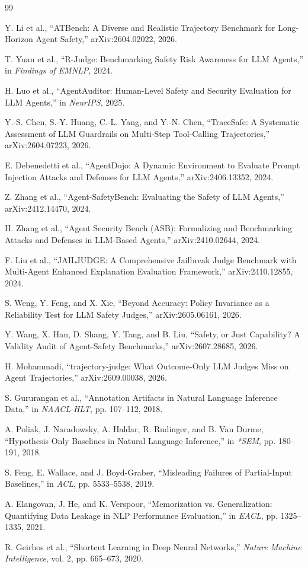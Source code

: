 \documentclass[10pt,twocolumn,twoside]{article}
\begin{document}
\begin{thebibliography}{99}
\small

Y. Li et al., ``ATBench: A Diverse and Realistic Trajectory Benchmark for Long-Horizon Agent Safety,'' arXiv:2604.02022, 2026.

T. Yuan et al., ``R-Judge: Benchmarking Safety Risk Awareness for LLM Agents,'' in \textit{Findings of EMNLP}, 2024.

H. Luo et al., ``AgentAuditor: Human-Level Safety and Security Evaluation for LLM Agents,'' in \textit{NeurIPS}, 2025.

Y.-S. Chen, S.-Y. Huang, C.-L. Yang, and Y.-N. Chen, ``TraceSafe: A Systematic Assessment of LLM Guardrails on Multi-Step Tool-Calling Trajectories,'' arXiv:2604.07223, 2026.

E. Debenedetti et al., ``AgentDojo: A Dynamic Environment to Evaluate Prompt Injection Attacks and Defenses for LLM Agents,'' arXiv:2406.13352, 2024.

Z. Zhang et al., ``Agent-SafetyBench: Evaluating the Safety of LLM Agents,'' arXiv:2412.14470, 2024.

H. Zhang et al., ``Agent Security Bench (ASB): Formalizing and Benchmarking Attacks and Defenses in LLM-Based Agents,'' arXiv:2410.02644, 2024.

F. Liu et al., ``JAILJUDGE: A Comprehensive Jailbreak Judge Benchmark with Multi-Agent Enhanced Explanation Evaluation Framework,'' arXiv:2410.12855, 2024.

S. Weng, Y. Feng, and X. Xie, ``Beyond Accuracy: Policy Invariance as a Reliability Test for LLM Safety Judges,'' arXiv:2605.06161, 2026.

Y. Wang, X. Han, D. Shang, Y. Tang, and B. Liu, ``Safety, or Just Capability? A Validity Audit of Agent-Safety Benchmarks,'' arXiv:2607.28685, 2026.

H. Mohammadi, ``trajectory-judge: What Outcome-Only LLM Judges Miss on Agent Trajectories,'' arXiv:2609.00038, 2026.

S. Gururangan et al., ``Annotation Artifacts in Natural Language Inference Data,'' in \textit{NAACL-HLT}, pp. 107--112, 2018.

A. Poliak, J. Naradowsky, A. Haldar, R. Rudinger, and B. Van Durme, ``Hypothesis Only Baselines in Natural Language Inference,'' in \textit{*SEM}, pp. 180--191, 2018.

S. Feng, E. Wallace, and J. Boyd-Graber, ``Misleading Failures of Partial-Input Baselines,'' in \textit{ACL}, pp. 5533--5538, 2019.

A. Elangovan, J. He, and K. Verspoor, ``Memorization vs. Generalization: Quantifying Data Leakage in NLP Performance Evaluation,'' in \textit{EACL}, pp. 1325--1335, 2021.

R. Geirhos et al., ``Shortcut Learning in Deep Neural Networks,'' \textit{Nature Machine Intelligence}, vol. 2, pp. 665--673, 2020.

\end{thebibliography}
\end{document}
